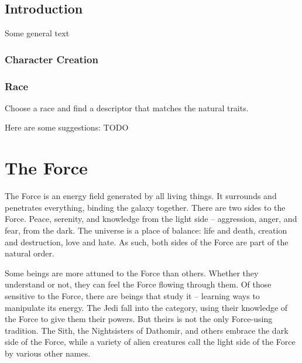 \documentclass[a4paper,10pt,final,twocolumn,oneside]{book}
\begin{document}
\section{Introduction} %
\label{sec:introduction}

Some general text

\subsection{Character Creation} %
\label{sub:character_creation}


\subsection{Race} %
\label{sub:race}

Choose a race and find a descriptor that matches the natural traits.

Here are some suggestions: TODO


\newpage

\chapter{The Force} %
\label{cha:force}
The Force is an energy field generated by all living things. It surrounds and penetrates everything, binding the galaxy together. There are two sides to the Force. Peace, serenity, and knowledge from the light side -- aggression, anger, and fear, from the dark. The universe is a place of balance: life and death, creation and destruction, love and hate. As such, both sides of the Force are part of the natural order. \par 
Some beings are more attuned to the Force than others. Whether they understand or not, they can feel the Force flowing through them. Of those sensitive to the Force, there are beings that study it -- learning ways to manipulate its energy. The Jedi fall into the category, using their knowledge of the Force to give them their powers. But theirs is not the only Force-using tradition. The Sith, the Nightsisters of Dathomir, and others embrace the dark side of the Force, while a variety of alien creatures call the light side of the Force by various other names. \par 
\end{document}
